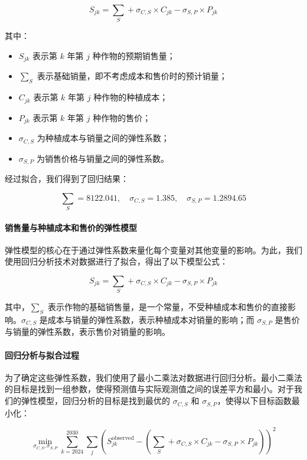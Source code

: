 \documentclass[12pt,a4paper]{nmmcm}
\begin{document}
\[
S_{jk} = \sum_S + \sigma_{C,S} \times C_{jk} - \sigma_{S,P} \times P_{jk}
\]

其中：
\begin{itemize}
    \item $S_{jk}$ 表示第 $k$ 年第 $j$ 种作物的预期销售量；
    \item $\sum_S$ 表示基础销量，即不考虑成本和售价时的预计销量；
    \item $C_{jk}$ 表示第 $k$ 年第 $j$ 种作物的种植成本；
    \item $P_{jk}$ 表示第 $k$ 年第 $j$ 种作物的售价；
    \item $\sigma_{C,S}$ 为种植成本与销量之间的弹性系数；
    \item $\sigma_{S,P}$ 为销售价格与销量之间的弹性系数。
\end{itemize}

经过拟合，我们得到了回归结果：

\[
\sum_S = 8122.041, \quad \sigma_{C,S} = 1.385, \quad \sigma_{S,P} = 1.2894.65
\]

\paragraph{销售量与种植成本和售价的弹性模型}

弹性模型的核心在于通过弹性系数来量化每个变量对其他变量的影响。为此，我们使用回归分析技术对数据进行了拟合，得出了以下模型公式：

\[
S_{jk} = \sum_S + \sigma_{C,S} \times C_{jk} - \sigma_{S,P} \times P_{jk}
\]

其中，$\sum_S$ 表示作物的基础销售量，是一个常量，不受种植成本和售价的直接影响。$\sigma_{C,S}$ 是成本与销量的弹性系数，表示种植成本对销量的影响；而 $\sigma_{S,P}$ 是售价与销量的弹性系数，表示售价对销量的影响。

\paragraph{回归分析与拟合过程}

为了确定这些弹性系数，我们使用了最小二乘法对数据进行回归分析。最小二乘法的目标是找到一组参数，使得预测值与实际观测值之间的误差平方和最小。对于我们的弹性模型，回归分析的目标是找到最优的 $\sigma_{C,S}$ 和 $\sigma_{S,P}$，使得以下目标函数最小化：

\[
\min_{\sigma_{C,S}, \sigma_{S,P}} \sum_{k=2024}^{2030} \sum_{j} \left( S_{jk}^{\text{observed}} - \left( \sum_S + \sigma_{C,S} \times C_{jk} - \sigma_{S,P} \times P_{jk} \right) \right)^2
\]
\end{document}
